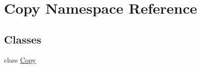 \hypertarget{namespace_copy}{\section{Copy Namespace Reference}
\label{namespace_copy}
}
\subsection*{Classes}
\begin{DoxyCompactItemize}
\item 
class \hyperlink{class_copy_1_1_copy}{Copy}
\end{DoxyCompactItemize}
